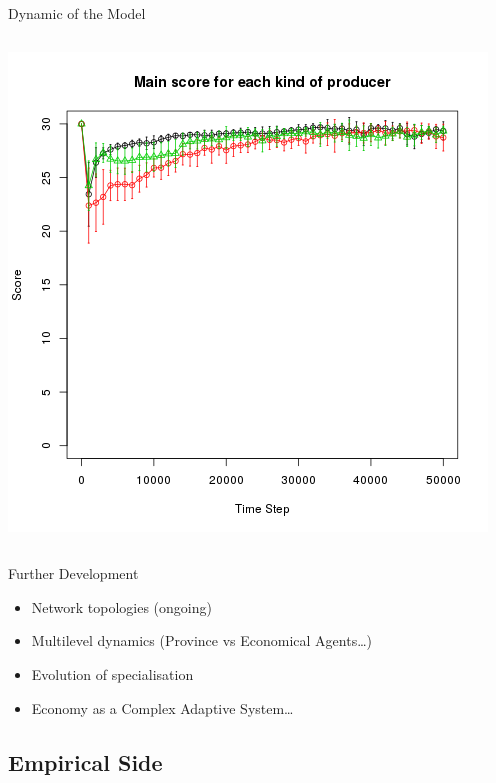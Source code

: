 \documentclass[8pt, handout=show,notes=show]{beamer}
\begin{document}
\begin{frame}{Dynamic of the Model}
\begin{columns}
		 \includegraphics[width=\textwidth]{images/scoreEx2.png}
	\end{columns}
	
\end{frame}

\begin{frame}{Further Development}
	\begin{itemize}
		\item Network topologies (ongoing)
			\vfil
		\item	Multilevel dynamics (Province vs Economical Agents\ldots)
			\vfil
		\item	Evolution of specialisation 
			\vfil
		\item	Economy as a Complex Adaptive System\ldots
	\end{itemize}
\end{frame}


\subsection{Empirical Side}
\end{document}
